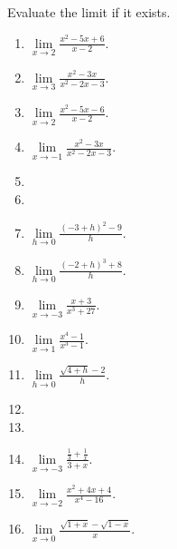 Evaluate the limit if it exists.
\begin{multicols}{2}
\begin{enumerate}[ref={\fcProblemRef}]
\item $\displaystyle\lim\limits_{x\to 2}\frac{x^2-5x+6}{x-2} $. 

\item $\displaystyle\lim\limits_{x\to 3}\frac{x^2-3x}{x^2-2x-3} $.

\item $\displaystyle\lim\limits_{x\to 2}\frac{x^2-5x-6}{x-2} $.

\item $\displaystyle\lim\limits_{x\to -1}\frac{x^2-3x}{x^{2}-2x-3} $.


\item 
\item 

\item $\displaystyle\lim\limits_{h\to 0}\frac{(-3+h)^2-9}{h} $.

\item $\displaystyle\lim\limits_{h\to 0}\frac{(-2+h)^3+8}{h} $.

\item $\displaystyle\lim\limits_{x\to -3}\frac{x+3}{x^3+27} $.

\item $\displaystyle\lim\limits_{x\to 1}\frac{x^4-1}{x^3-1} $.

\item $\displaystyle\lim\limits_{h\to 0}\frac{\sqrt{4+h}-2}{h} $.

\item 
\item 
\item $\displaystyle\lim\limits_{x\to -3} \frac{\frac{1}{3}+ \frac{1}{x}} {3+x}$.

\item $\displaystyle\lim\limits_{x\to -2} \frac{x^2+4x+4}{x^4-16}$.

\item $\displaystyle\lim\limits_{x\to 0} \frac{\sqrt{1+x}- \sqrt{1-x}}{x}$.


\end{enumerate}
\end{multicols}
